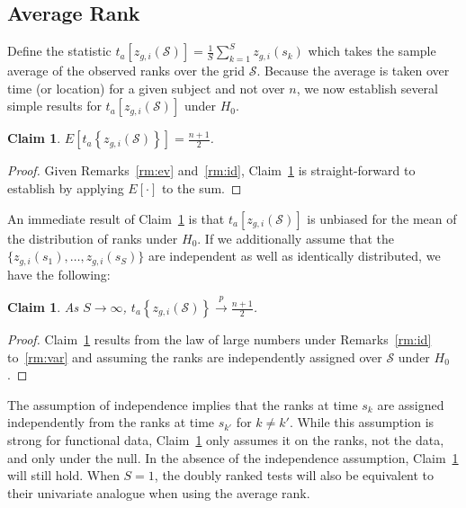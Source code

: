 \documentclass[12pt]{article}
\theoremstyle{plain}
\newtheorem{claim}[axiom]{Claim}
\theoremstyle{remark}
\begin{document}
	\subsection{Average Rank}

	Define the statistic $t_a\left[z_{g,i}(\mathcal{S})\right] = \frac{1}{S}\sum_{k=1}^S z_{g,i}(s_k)$ which takes the sample average of the observed ranks over the grid $\mathcal{S}$. Because the average is taken over time (or location) for a given subject and not over $n$, we now establish several simple results for $t_a\left[z_{g,i}(\mathcal{S})\right]$ under $H_0$.
		
	
	\begin{claim}\label{cl:arm} 
		$E\left[t_a\left\{z_{g,i}(\mathcal{S})\right\}\right] = \frac{n + 1}{2}$.
	\end{claim}

	\begin{proof}
		 Given Remarks~\ref{rm:ev} and~\ref{rm:id}, Claim~\ref{cl:arm} is straight-forward to establish by applying $E[\cdot]$ to the sum.
	\end{proof}
	
	An immediate result of Claim~\ref{cl:arm} is that $t_a\left[z_{g,i}(\mathcal{S})\right]$ is unbiased for the mean of the distribution of ranks under $H_0$. If we additionally assume that the  $\{z_{g,i}(s_1), \ldots, z_{g,i}(s_S)\}$ are independent as well as identically distributed, we have the following:
	
	\begin{claim}\label{cl:arc} 
		As $S \rightarrow \infty$, $t_a\left\{z_{g,i}(\mathcal{S})\right\} \stackrel{p}{\longrightarrow} \frac{n + 1}{2}$.
	\end{claim}
	
	\begin{proof}
		Claim~\ref{cl:arc} results from the law of large numbers under Remarks~\ref{rm:id} to~\ref{rm:var} and assuming the ranks are independently assigned over $\mathcal{S}$ under $H_0$.
	\end{proof}

	The assumption of independence implies that the ranks at time $s_k$ are assigned independently from the ranks at time $s_{k'}$ for $k \neq k'$. While this assumption is strong for functional data, Claim~\ref{cl:arc} only assumes it on the ranks, not the data, and only under the null. In the absence of the independence assumption, Claim~\ref{cl:arm} will still hold. When $S = 1$, the doubly ranked tests will also be equivalent to their univariate analogue when using the average rank.
	
\end{document}
